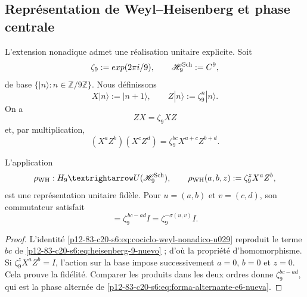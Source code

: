 \subsection{Représentation de Weyl--Heisenberg et phase centrale}

L’extension nonadique admet une réalisation unitaire explicite. Soit
\[
 \zeta_9:=\exp(2\pi i/9),
 \qquad
 \mathscr H_9^{\rm Sch}:=\mathbb C^9,
\]
de base \(\{|n\rangle:n\in\mathbb Z/9\mathbb Z\}\). Nous définissons
\begin{equation}
 X|n\rangle:=|n+1\rangle,
 \qquad
 Z|n\rangle:=\zeta_9^n|n\rangle.
 \label{p12-83-c20-s6:eq:weyl-desplazamiento-fase-u029}
\end{equation}
On a
\[
 ZX=\zeta_9XZ
\]
et, par multiplication,
\begin{equation}
 (X^aZ^b)(X^cZ^d)
 =\zeta_9^{bc}X^{a+c}Z^{b+d}.
 \label{p12-83-c20-s6:eq:cociclo-weyl-nonadico-u029}
\end{equation}

\begin{theorem}
\label{p12-83-c20-s6:thm:representacion-weyl-heisenberg-u029}
L'application
\begin{equation}
 \rho_{\rm WH}:\mathcal H_9\longrightarrow
 U(\mathscr H_9^{\rm Sch}),
 \qquad
 \rho_{\rm WH}(a,b,z):=\zeta_9^zX^aZ^b,
 \label{p12-83-c20-s6:eq:representacion-weyl-heisenberg-u029}
\end{equation}
est une représentation unitaire fidèle. Pour
\(u=(a,b)\) et \(v=(c,d)\), son commutateur satisfait
\begin{equation}
 [\rho_{\rm WH}(u,0),\rho_{\rm WH}(v,0)]
 =\zeta_9^{\,bc-ad}I
 =\zeta_9^{-\sigma(u,v)}I.
 \label{p12-83-c20-s6:eq:conmutador-weyl-holonomia-u029}
\end{equation}
\end{theorem}

\begin{proof}
L’identité \eqref{p12-83-c20-s6:eq:cociclo-weyl-nonadico-u029} reproduit le terme
\(bc\) de \eqref{p12-83-c20-s6:eq:heisenberg-9-nuevo} ; d’où la propriété
d’homomorphisme. Si \(\zeta_9^zX^aZ^b=I\), l’action sur la base impose
successivement \(a=0\), \(b=0\) et \(z=0\). Cela prouve la fidélité. Comparer
les produits dans les deux ordres donne
\(\zeta_9^{bc-ad}\), qui est la phase alternée de
\eqref{p12-83-c20-s6:eq:forma-alternante-e6-nueva}.
\end{proof}

